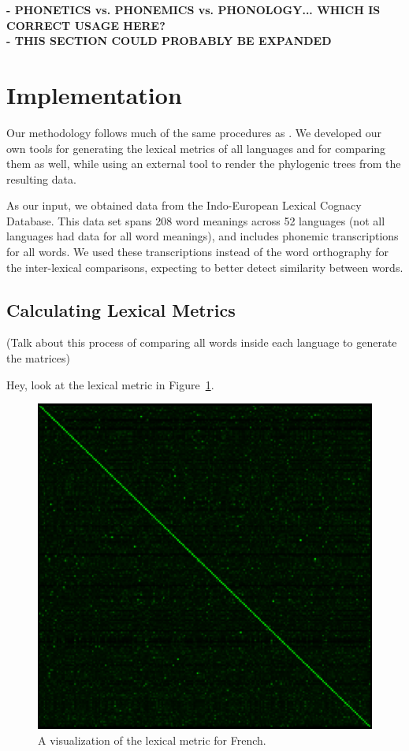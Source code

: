 \documentclass[10pt,a4]{article}
\begin{document}
\textbf{- PHONETICS vs. PHONEMICS vs. PHONOLOGY... WHICH IS CORRECT USAGE HERE?} \\

\textbf{- THIS SECTION COULD PROBABLY BE EXPANDED}

\section{Implementation}

Our methodology follows much of the same procedures as .  We developed our own tools for generating the lexical metrics of all languages and for comparing them as well, while using an external tool to render the phylogenic trees from the resulting data.

As our input, we obtained data from the Indo-European Lexical Cognacy Database.  This data set spans 208 word meanings across 52 languages (not all languages had data for all word meanings), and includes phonemic transcriptions for all words.  We used these transcriptions instead of the word orthography for the inter-lexical comparisons, expecting to better detect similarity between words.

\subsection{Calculating Lexical Metrics}

(Talk about this process of comparing all words inside each language to generate the matrices)

Hey, look at the lexical metric in Figure~\ref{fig:french}.

\begin{figure}[ht]
\centering
\includegraphics[width=0.8\linewidth]{french3}
\caption{A visualization of the lexical metric for French.}
\label{fig:french}
\end{figure}
\end{document}
